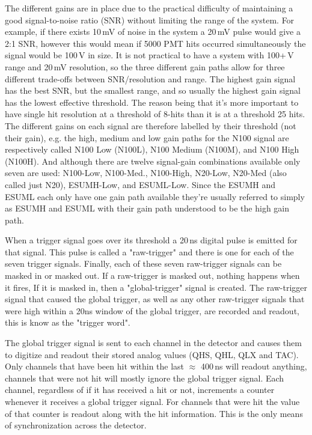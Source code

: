 The different gains are in place due to the practical difficulty of maintaining
a good signal-to-noise ratio (SNR) without limiting the range of the
system.
For example, if there exists 10\,mV of noise in the system a 20\,mV pulse
would give a 2:1 SNR, however this would mean if 5000 PMT hits occurred simultaneously
the signal would be 100\,V in size.
It is not practical to have a system with 100+\,V range and 20\,mV resolution,
so the three different gain paths allow for three different trade-offs between
SNR/resolution and range.
The highest gain signal has the best SNR, but the smallest range, and so usually
the highest gain signal has the lowest effective threshold.
The reason being that it's more important to have single hit resolution at a threshold
of 8-hits than it is at a threshold 25 hits.
The different gains on each signal are therefore labelled by their threshold (not their gain), e.g.
the high, medium and low gain paths for the N100 signal are respectively called
N100 Low (N100L), N100 Medium (N100M), and N100 High (N100H).
And although there are twelve signal-gain combinations available only seven are
used: N100-Low, N100-Med., N100-High, N20-Low, N20-Med (also called just N20), ESUMH-Low, and ESUML-Low.
Since the ESUMH and ESUML each only have one gain path available they're usually
referred to simply as ESUMH and ESUML with their gain path understood to be
the high gain path.

When a trigger signal goes over its threshold a 20\,ns digital pulse is
emitted for that signal. This pulse is called a "raw-trigger" and there is
one for each of the seven trigger signals.
Finally, each of these seven raw-trigger signals can be masked in or masked out.
If a raw-trigger is masked out, nothing happens when it fires,
If it is masked in, then a "global-trigger" signal is created.
The raw-trigger signal that caused the global trigger, as well as any other
raw-trigger signals that were high within a 20ns window of the global trigger,
are recorded and readout, this is know as the "trigger word".

The global trigger signal is sent to each channel in the detector and
causes them to digitize and readout their stored analog values (QHS, QHL, QLX and TAC).
Only channels that have been hit within the last $\approx$ 400\,ns will readout
anything, channels that were not hit will mostly ignore the global trigger signal.
Each channel, regardless of if it has received a hit or not, increments
a counter whenever it receives a global trigger signal.
For channels that were hit the value of that counter is readout
along with the hit information.
This is the only means of synchronization across the detector.

